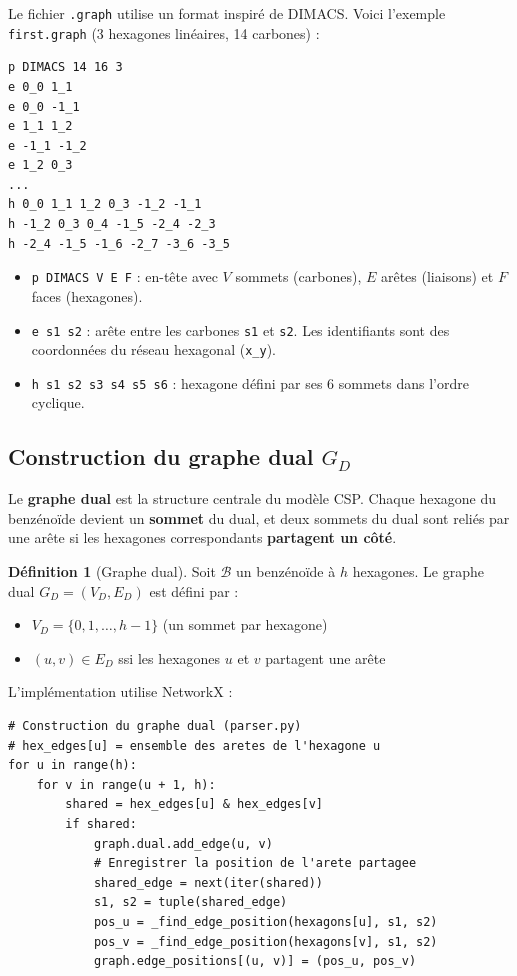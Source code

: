 \documentclass[12pt,a4paper]{article}
\theoremstyle{definition}
\newtheorem{definition}{Définition}[section]
\newcommand{\GD}{G_{\!D}}
\begin{document}
Le fichier \texttt{.graph} utilise un format inspiré de DIMACS. Voici l'exemple
\texttt{first.graph} (3 hexagones linéaires, 14 carbones) :

\begin{lstlisting}[style=benzai]
p DIMACS 14 16 3
e 0_0 1_1
e 0_0 -1_1
e 1_1 1_2
e -1_1 -1_2
e 1_2 0_3
...
h 0_0 1_1 1_2 0_3 -1_2 -1_1
h -1_2 0_3 0_4 -1_5 -2_4 -2_3
h -2_4 -1_5 -1_6 -2_7 -3_6 -3_5
\end{lstlisting}

\begin{itemize}
  \item \texttt{p DIMACS V E F} : en-tête avec $V$ sommets (carbones), $E$ arêtes (liaisons)
    et $F$ faces (hexagones).
  \item \texttt{e s1 s2} : arête entre les carbones \texttt{s1} et \texttt{s2}. Les identifiants
    sont des coordonnées du réseau hexagonal (\texttt{x\_y}).
  \item \texttt{h s1 s2 s3 s4 s5 s6} : hexagone défini par ses 6 sommets dans l'ordre
    cyclique.
\end{itemize}

\subsection{Construction du graphe dual $\GD$}

Le \textbf{graphe dual} est la structure centrale du modèle CSP. Chaque hexagone du benzénoïde
devient un \textbf{sommet} du dual, et deux sommets du dual sont reliés par une arête si les
hexagones correspondants \textbf{partagent un côté}.

\begin{definition}[Graphe dual]
  Soit $\mathcal{B}$ un benzénoïde à $h$ hexagones. Le graphe dual
  $\GD = (V_D, E_D)$ est défini par :
  \begin{itemize}
    \item $V_D = \{0, 1, \ldots, h-1\}$ (un sommet par hexagone)
    \item $(u, v) \in E_D$ ssi les hexagones $u$ et $v$ partagent une arête
  \end{itemize}
\end{definition}

L'implémentation utilise NetworkX :

\begin{lstlisting}
# Construction du graphe dual (parser.py)
# hex_edges[u] = ensemble des aretes de l'hexagone u
for u in range(h):
    for v in range(u + 1, h):
        shared = hex_edges[u] & hex_edges[v]
        if shared:
            graph.dual.add_edge(u, v)
            # Enregistrer la position de l'arete partagee
            shared_edge = next(iter(shared))
            s1, s2 = tuple(shared_edge)
            pos_u = _find_edge_position(hexagons[u], s1, s2)
            pos_v = _find_edge_position(hexagons[v], s1, s2)
            graph.edge_positions[(u, v)] = (pos_u, pos_v)
\end{lstlisting}
\end{document}
